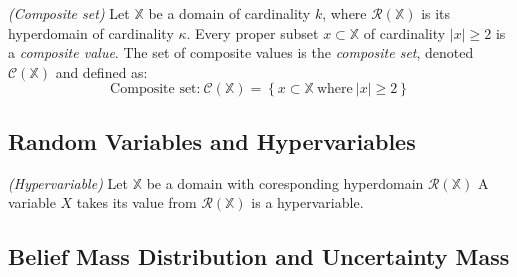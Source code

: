 \begin{definition}
	\emph{(Composite set)} Let $\mathbb{X}$ be a domain of cardinality $k$, where $\mathcal{R}(\mathbb{X})$ is its hyperdomain of cardinality $\kappa$. Every proper subset $x \subset \mathbb{X}$ of cardinality $\left|x\right| \geq 2$ is a \emph{composite value}. The set of composite values is the \emph{composite set}, denoted $\mathcal{C}(\mathbb{X})$ and defined as:
	\begin{equation}
		\text{Composite set:}\ \mathcal{C}(\mathbb{X}) = \left\{x \subset \mathbb{X}\ \text{where}\ \left|x\right| \geq 2\right\}
	\end{equation}
\end{definition}

\subsection{Random Variables and Hypervariables}

\begin{definition}
	\emph{(Hypervariable)} Let $\mathbb{X}$ be a domain with coresponding hyperdomain $\mathcal{R}(\mathbb{X})$ A variable $X$ takes its value from $\mathcal{R}(\mathbb{X})$ is a hypervariable.
\end{definition}

\subsection{Belief Mass Distribution and Uncertainty Mass}

